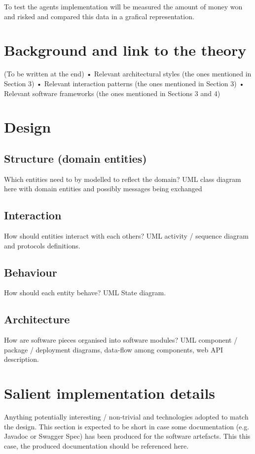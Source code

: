 To test the agents implementation will be measured the amount of money won and risked and compared this data in a grafical representation.

\chapter{Background and link to the theory}

(To be written at the end)
• Relevant architectural styles (the ones mentioned in Section 3)
• Relevant interaction patterns (the ones mentioned in Section 3)
• Relevant software frameworks (the ones mentioned in Sections 3 and 4)


\chapter{Design}

\section{Structure (domain entities)}

Which entities need to by modelled to reflect the domain? UML class diagram here with
domain entities and possibly messages being exchanged
\section{Interaction}
How should entities interact with each others? UML activity / sequence diagram and
protocols definitions.
\section{Behaviour}
How should each entity behave? UML State diagram.
\section{Architecture}
How are software pieces organised into software modules? UML component / package /
deployment diagrams, data-flow among components, web API description.


\chapter{Salient implementation details}
Anything potentially interesting / non-trivial and technologies adopted to match the
design. This section is expected to be short in case some documentation (e.g. Javadoc
or Swagger Spec) has been produced for the software artefacts. This this case, the
produced documentation should be referenced here.
